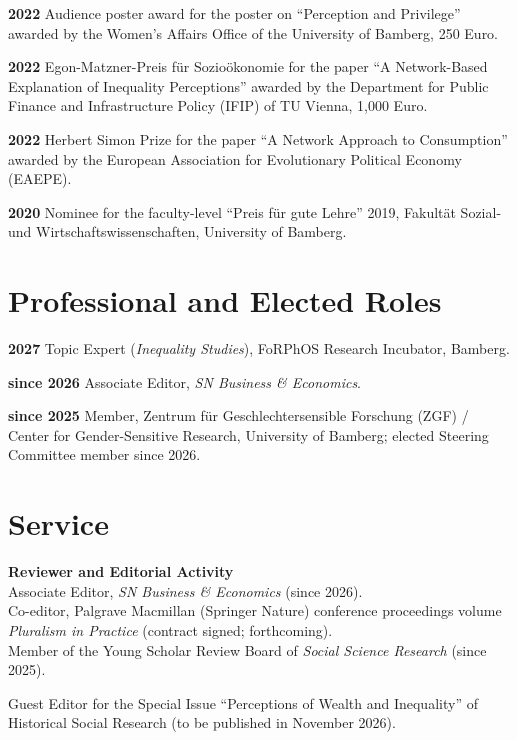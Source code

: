 \documentclass[margin]{res}
\begin{document}
\begin{resume}
	\textbf{2022} Audience poster award for the poster on ``Perception and Privilege'' awarded by the Women's Affairs Office of the University of Bamberg, 250 Euro.
	
	\textbf{2022} Egon-Matzner-Preis f\"ur Sozio\"okonomie for the paper ``A Network-Based Explanation of Inequality Perceptions'' awarded by the Department for Public Finance and Infrastructure Policy (IFIP) of TU Vienna, 1,000 Euro.
	
	\textbf{2022} Herbert Simon Prize for the paper ``A Network Approach to Consumption'' awarded by the European Association for Evolutionary Political Economy (EAEPE).
	
	\textbf{2020} Nominee for the faculty-level ``Preis f\"ur gute Lehre'' 2019, Fakult\"at Sozial- und Wirtschaftswissenschaften, University of Bamberg.
	
	\section{Professional and Elected Roles}
	\textbf{2027} Topic Expert (\textit{Inequality Studies}), FoRPhOS Research Incubator, Bamberg.
	
	\textbf{since 2026} Associate Editor, \textit{SN Business \& Economics}.
	
	\textbf{since 2025} Member, Zentrum f\"ur Geschlechtersensible Forschung (ZGF) / Center for Gender-Sensitive Research, University of Bamberg; elected Steering Committee member since 2026.
	
	\section{Service} 
	
	\textbf{Reviewer and Editorial Activity}\\
	Associate Editor, \textit{SN Business \& Economics} (since 2026).\\
	
	Co-editor, Palgrave Macmillan (Springer Nature) conference proceedings volume \textit{Pluralism in Practice} (contract signed; forthcoming).\\
	
	Member of the Young Scholar Review Board of \textit{Social Science Research} (since 2025).
	
	Guest Editor for the Special Issue ``Perceptions of Wealth and Inequality'' of Historical Social Research (to be published in November 2026).
	

\end{resume}
\end{document}
